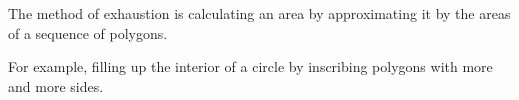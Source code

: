 \documentclass[12pt]{article}
\begin{document}
The method of exhaustion is calculating an area by approximating it by the areas of a sequence of polygons. 

For example, filling up the interior of a circle by inscribing polygons with more and more sides.
\end{document}
